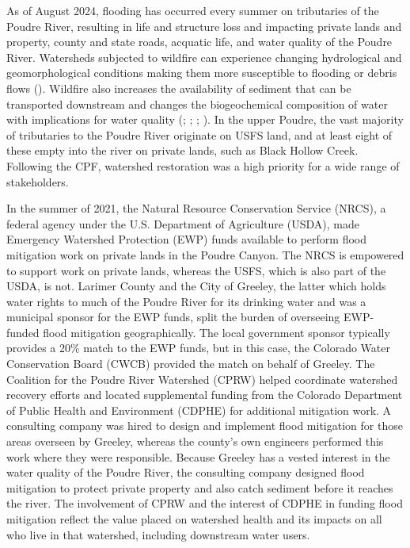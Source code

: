 \documentclass[
]{article}
\begin{document}
As of August 2024, flooding has occurred every summer on tributaries of the Poudre River, resulting in life and structure loss and impacting private lands and property, county and state roads, acquatic life, and water quality of the Poudre River. Watersheds subjected to wildfire can experience changing hydrological and geomorphological conditions making them more susceptible to flooding or debris flows (). Wildfire also increases the availability of sediment that can be transported downstream and changes the biogeochemical composition of water with implications for water quality (; ; ; ). In the upper Poudre, the vast majority of tributaries to the Poudre River originate on USFS land, and at least eight of these empty into the river on private lands, such as Black Hollow Creek. Following the CPF, watershed restoration was a high priority for a wide range of stakeholders.

In the summer of 2021, the Natural Resource Conservation Service (NRCS), a federal agency under the U.S. Department of Agriculture (USDA), made Emergency Watershed Protection (EWP) funds available to perform flood mitigation work on private lands in the Poudre Canyon. The NRCS is empowered to support work on private lands, whereas the USFS, which is also part of the USDA, is not. Larimer County and the City of Greeley, the latter which holds water rights to much of the Poudre River for its drinking water and was a municipal sponsor for the EWP funds, split the burden of overseeing EWP-funded flood mitigation geographically. The local government sponsor typically provides a 20\% match to the EWP funds, but in this case, the Colorado Water Conservation Board (CWCB) provided the match on behalf of Greeley. The Coalition for the Poudre River Watershed (CPRW) helped coordinate watershed recovery efforts and located supplemental funding from the Colorado Department of Public Health and Environment (CDPHE) for additional mitigation work. A consulting company was hired to design and implement flood mitigation for those areas overseen by Greeley, whereas the county's own engineers performed this work where they were responsible. Because Greeley has a vested interest in the water quality of the Poudre River, the consulting company designed flood mitigation to protect private property and also catch sediment before it reaches the river. The involvement of CPRW and the interest of CDPHE in funding flood mitigation reflect the value placed on watershed health and its impacts on all who live in that watershed, including downstream water users.
\end{document}
